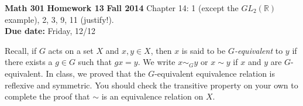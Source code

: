 \documentclass[12pt,reqno]{amsart}
\newcommand{\<}{\ensuremath{\langle}}
\renewcommand{\>}{\ensuremath{\rangle}}
\newcommand{\boldemph}{\emph}
\begin{document}
\thispagestyle{empty}

\noindent \textbf{Math 301} \hskip5cm {\bf Homework 13} \hfill {\bf Fall 2014}
\vskip1cm
 Chapter 14: 1 (except the $GL_2( {\mathbb R} )$
example), 2, 3, 9, 11 (justify!).\\
{\bf Due date:} Friday, 12/12

\medskip
Recall, if $G$ acts on a set $X$ and $x, y \in X$, then $x$ is said
to be \boldemph{$G$-equivalent} to $y$ if there exists a $g \in G$ such that 
$gx =y$. We  write $x \sim_G y$ or $x \sim y$ if $x$ and $y$ are $G$-equivalent. 
In class, we proved that the $G$-equivalent equivalence relation is reflexive and
symmetric. You should check the transitive property on your own to complete the
proof that $\sim$ is an equivalence relation on $X$. 
 
\end{document}
